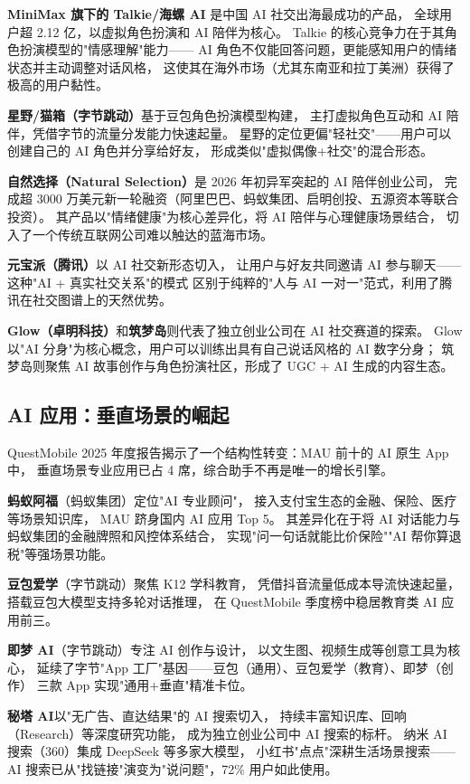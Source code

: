 \textbf{MiniMax 旗下的 Talkie/海螺 AI} 是中国 AI 社交出海最成功的产品，
全球用户超 2.12 亿，以虚拟角色扮演和 AI 陪伴为核心。
Talkie 的核心竞争力在于其角色扮演模型的"情感理解"能力——
AI 角色不仅能回答问题，更能感知用户的情绪状态并主动调整对话风格，
这使其在海外市场（尤其东南亚和拉丁美洲）获得了极高的用户黏性。

\textbf{星野/猫箱（字节跳动）}基于豆包角色扮演模型构建，
主打虚拟角色互动和 AI 陪伴，凭借字节的流量分发能力快速起量。
星野的定位更偏"轻社交"——用户可以创建自己的 AI 角色并分享给好友，
形成类似"虚拟偶像+社交"的混合形态。

\textbf{自然选择（Natural Selection）}是 2026 年初异军突起的 AI 陪伴创业公司，
完成超 3000 万美元新一轮融资（阿里巴巴、蚂蚁集团、启明创投、五源资本等联合投资）。
其产品以"情绪健康"为核心差异化，将 AI 陪伴与心理健康场景结合，
切入了一个传统互联网公司难以触达的蓝海市场。

\textbf{元宝派（腾讯）}以 AI 社交新形态切入，
让用户与好友共同邀请 AI 参与聊天——这种"AI + 真实社交关系"的模式
区别于纯粹的"人与 AI 一对一"范式，利用了腾讯在社交图谱上的天然优势。

\textbf{Glow（卓明科技）}和\textbf{筑梦岛}则代表了独立创业公司在 AI 社交赛道的探索。
Glow 以"AI 分身"为核心概念，用户可以训练出具有自己说话风格的 AI 数字分身；
筑梦岛则聚焦 AI 故事创作与角色扮演社区，形成了 UGC + AI 生成的内容生态。

\subsection{AI 应用：垂直场景的崛起}
\label{subsec:china-ai-vertical-apps}

QuestMobile 2025 年度报告揭示了一个结构性转变：MAU 前十的 AI 原生 App 中，
垂直场景专业应用已占 4 席，综合助手不再是唯一的增长引擎。

\textbf{蚂蚁阿福}（蚂蚁集团）定位"AI 专业顾问"，
接入支付宝生态的金融、保险、医疗等场景知识库，
MAU 跻身国内 AI 应用 Top 5。
其差异化在于将 AI 对话能力与蚂蚁集团的金融牌照和风控体系结合，
实现"问一句话就能比价保险""AI 帮你算退税"等强场景功能。

\textbf{豆包爱学}（字节跳动）聚焦 K12 学科教育，
凭借抖音流量低成本导流快速起量，
搭载豆包大模型支持多轮对话推理，
在 QuestMobile 季度榜中稳居教育类 AI 应用前三。

\textbf{即梦 AI}（字节跳动）专注 AI 创作与设计，
以文生图、视频生成等创意工具为核心，
延续了字节"App 工厂"基因——豆包（通用）、豆包爱学（教育）、即梦（创作）
三款 App 实现"通用+垂直"精准卡位。

\textbf{秘塔 AI}以"无广告、直达结果"的 AI 搜索切入，
持续丰富知识库、回响（Research）等深度研究功能，
成为独立创业公司中 AI 搜索的标杆。
纳米 AI 搜索（360）集成 DeepSeek 等多家大模型，
小红书"点点"深耕生活场景搜索——
AI 搜索已从"找链接"演变为"说问题"，72\% 用户如此使用。

